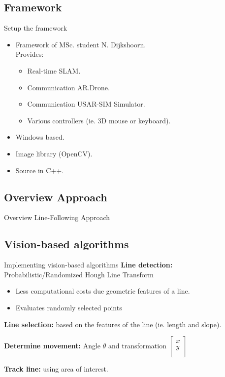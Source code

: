 \documentclass{beamer}
\begin{document}
\subsection{Framework}
\begin{frame}{Setup the framework}
\begin{itemize}
\item Framework of MSc. student N. Dijkshoorn.\\
Provides:
\begin{itemize}
\item Real-time SLAM.
\item Communication AR.Drone.
\item Communication USAR-SIM Simulator.
\item Various controllers (ie. 3D mouse or keyboard).
\end{itemize}
\item Windows based.
\item Image library (OpenCV).
\item Source in C++.
\end{itemize}
\end{frame}

\subsection{Overview Approach}
\begin{frame}{Overview Line-Following Approach}
\end{frame}

\subsection{Vision-based algorithms}
\begin{frame}{Implementing vision-based algorithms}
\textbf{Line detection:}
Probabilistic/Randomized Hough Line  Transform
\begin{itemize}
\item Less computational costs due geometric features of a line.
\item Evaluates randomly selected points
\end{itemize}

\textbf{Line selection:} based on the features of the line (ie. length and slope).

\textbf{Determine movement:} Angle $\theta$ and transformation $\begin{bmatrix}x\\y\\\end{bmatrix}$

\textbf{Track line:} using area of interest.
\end{frame}
\end{document}
